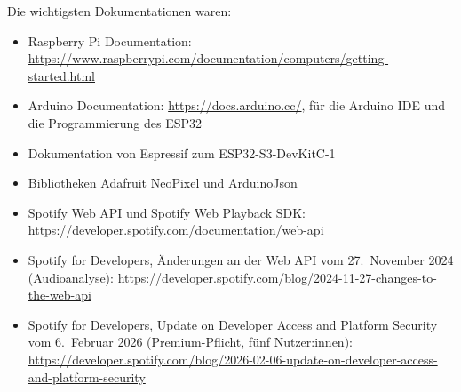 \documentclass[11pt,a4paper]{article}
\begin{document}
Die wichtigsten Dokumentationen waren:

\begin{itemize}[itemsep=2pt]
  \item Raspberry Pi Documentation: \url{https://www.raspberrypi.com/documentation/computers/getting-started.html}
  \item Arduino Documentation: \url{https://docs.arduino.cc/}, für die Arduino IDE und die Programmierung des ESP32
  \item Dokumentation von Espressif zum ESP32-S3-DevKitC-1
  \item Bibliotheken Adafruit NeoPixel und ArduinoJson
  \item Spotify Web API und Spotify Web Playback SDK: \url{https://developer.spotify.com/documentation/web-api}
  \item Spotify for Developers, Änderungen an der Web API vom 27.~November 2024 (Audioanalyse): \url{https://developer.spotify.com/blog/2024-11-27-changes-to-the-web-api}
  \item Spotify for Developers, Update on Developer Access and Platform Security vom 6.~Februar 2026 (Premium-Pflicht, fünf Nutzer:innen): \url{https://developer.spotify.com/blog/2026-02-06-update-on-developer-access-and-platform-security}
\end{itemize}
\end{document}
